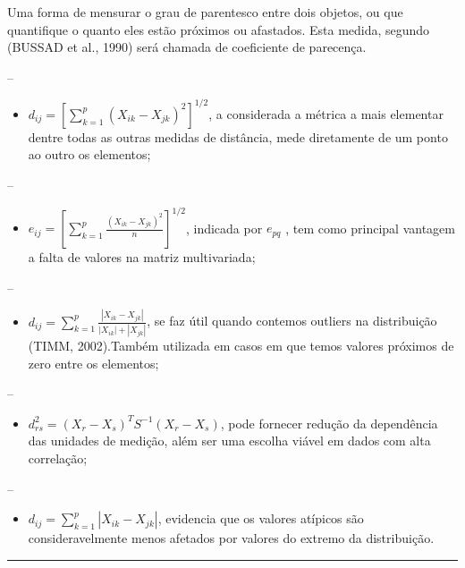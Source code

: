 \documentclass[
]{article}
\begin{document}
Uma forma de mensurar o grau de parentesco entre dois objetos, ou que
quantifique o quanto eles estão próximos ou afastados. Esta medida,
segundo (BUSSAD et al., 1990) será chamada de coeficiente de parecença.

--

\begin{itemize}
\item
  \({d_{ij} = \left [\sum_{k = 1}^{p}(X_{ik}-X_{jk})^2 \right ]^{1/2}}\),
  a considerada a métrica a mais elementar dentre todas as outras
  medidas de distância, mede diretamente de um ponto ao outro os
  elementos;
\end{itemize}

--

\begin{itemize}
\item
  \(e_{ij} = \left [ \sum_{k = 1}^{p}\frac{(X_{ik}-X_{jk})^2}{n} \right ]^{1/2}\),
  indicada por \(e_{pq}\) , tem como principal vantagem a falta de
  valores na matriz multivariada;
\end{itemize}

--

\begin{itemize}
\item
  \(d_{ij} = \sum_{k=1}^{p}\frac{|X_{ik}-X_{jk}|}{|X_{ik}|+|X_{jk}|}\),
  se faz útil quando contemos outliers na distribuição (TIMM,
  2002).Também utilizada em casos em que temos valores próximos de zero
  entre os elementos;
\end{itemize}

--

\begin{itemize}
\item
  \(d_{rs}^2 = (X_r- X_s)^TS^{-1}(X_r - X_s)\), pode fornecer redução da
  dependência das unidades de medição, além ser uma escolha viável em
  dados com alta correlação;
\end{itemize}

--

\begin{itemize}
\item
  \(d_{ij} = \sum_{k = 1}^{p} \left | X_{ik}-X_{jk} \right |\),
  evidencia que os valores atípicos são consideravelmente menos afetados
  por valores do extremo da distribuição.
\end{itemize}

\begin{center}\rule{0.5\linewidth}{0.5pt}\end{center}
\end{document}
